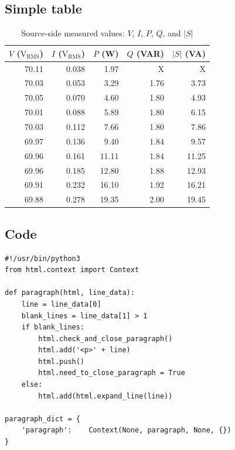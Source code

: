 \documentclass[letterpaper,twoside,notitlepage,12pt]{article}
\begin{document}
\subsection{Simple table}

\begin{table}[H]
\begin{center}
\caption{\small Source-side measured values: $V$, $I$, $P$, $Q$, and $|S|$}
\vspace{5mm}
\begin{tabular}{rrrrr}
\toprule
$V$ ($\text{V}_\text{RMS}$) &
$I$ ($\text{V}_\text{RMS}$) &
$P$ (W) &
$Q$ (VAR) &
$|S|$ (VA) \\ 
\midrule
70.11	& 0.038	& 1.97	& X	& X \\
70.03	& 0.053	& 3.29	& 1.76	& 3.73 \\
70.05	& 0.070	& 4.60	& 1.80	& 4.93 \\
70.01	& 0.088	& 5.89	& 1.80	& 6.15 \\
70.03	& 0.112	& 7.66	& 1.80	& 7.86 \\
69.97	& 0.136	& 9.40	& 1.84	& 9.57 \\
69.96	& 0.161	& 11.11	& 1.84	& 11.25 \\
69.96	& 0.185	& 12.80	& 1.88	& 12.93 \\
69.91	& 0.232	& 16.10	& 1.92	& 16.21 \\
69.88	& 0.278	& 19.35	& 2.00	& 19.45 \\
\bottomrule
\end{tabular}
\end{center}
\end{table}



\subsection{Code}

\begin{verbatim}
#!/usr/bin/python3
from html.context import Context

def paragraph(html, line_data):
    line = line_data[0]
    blank_lines = line_data[1] > 1
    if blank_lines:
        html.check_and_close_paragraph()
        html.add('<p>' + line)
        html.push()
        html.need_to_close_paragraph = True
    else:
        html.add(html.expand_line(line))

paragraph_dict = {
    'paragraph':    Context(None, paragraph, None, {})
}
\end{verbatim}
\end{document}
